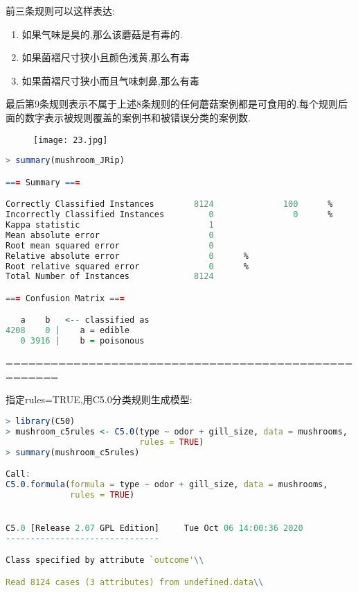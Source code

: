 \documentclass[11pt,a4paper,oneside]{book}
\begin{document}
前三条规则可以这样表达:
\begin{enumerate}
	\item 如果气味是臭的,那么该蘑菇是有毒的.
	\item 如果菌褶尺寸狭小且颜色浅黄,那么有毒
	\item 如果菌褶尺寸狭小而且气味刺鼻,那么有毒
\end{enumerate}
最后第9条规则表示不属于上述8条规则的任何蘑菇案例都是可食用的.每个规则后面的数字表示被规则覆盖的案例书和被错误分类的案例数.

\begin{figure}[H]
	\centering
	\texttt{[image: 23.jpg]}
\end{figure}
\begin{lstlisting}[language=r]
> summary(mushroom_JRip)

=== Summary ===

Correctly Classified Instances        8124              100      %
Incorrectly Classified Instances         0                0      %
Kappa statistic                          1     
Mean absolute error                      0     
Root mean squared error                  0     
Relative absolute error                  0      %
Root relative squared error              0      %
Total Number of Instances             8124     

=== Confusion Matrix ===

   a    b   <-- classified as
4208    0 |    a = edible
   0 3916 |    b = poisonous
\end{lstlisting}

=====================================================

指定rules=TRUE,用C5.0分类规则生成模型:
\begin{lstlisting}[language=r]
> library(C50)
> mushroom_c5rules <- C5.0(type ~ odor + gill_size, data = mushrooms, 
                           rules = TRUE)
> summary(mushroom_c5rules)

Call:
C5.0.formula(formula = type ~ odor + gill_size, data = mushrooms, 
             rules = TRUE)


C5.0 [Release 2.07 GPL Edition]  	Tue Oct 06 14:00:36 2020
-------------------------------

Class specified by attribute `outcome'\\

Read 8124 cases (3 attributes) from undefined.data\\
\end{lstlisting}
\end{document}
